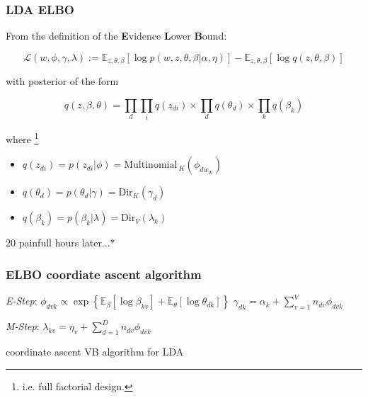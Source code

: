 \documentclass[10pt]{beamer}
\begin{document}
\begin{frame}
\frametitle{LDA ELBO}

From the definition of the \textbf{E}vidence \textbf{L}ower \textbf{B}ound:

$$ \mathcal{L}(w, \phi, \gamma, \lambda) := \mathbb{E}_{z, \theta, \beta}\left[\log p(w, z, \theta, \beta| \alpha, \eta) \right] - \mathbb{E}_{z, \theta, \beta}\left[\log q(z, \theta, \beta) \right]$$

with posterior of the form

$$q(z, \beta, \theta) = \prod_d \prod_i q(z_{di}) \times \prod_d q(\theta_d) \times \prod_k q(\beta_k)$$

where \footnote{i.e. full factorial design.}

\begin{itemize}
    \item $q(z_{di}) = p(z_{di}|\phi) = \mathrm{Multinomial}_{ \ K}(\phi_{dw_{di}}) $
    \item $q(\theta_d) = p(\theta_d|\gamma) = \mathrm{Dir}_{K}(\gamma_{d}) $
    \item $q(\beta_k) = p(\beta_k|\lambda) = \mathrm{Dir}_{V}(\lambda_{k}) $  
\end{itemize}

\end{frame}


\begin{frame}

\begin{center}
    20 painfull hours later...*
\end{center}



\end{frame}


\begin{frame}
\frametitle{ELBO coordiate ascent algorithm}

\begin{algorithm}[H]
\begin{algorithmic}[1]

        \STATE \emph{E-Step}:
            \STATE $\phi_{dvk} \propto \exp \left\{ \mathbb{E}_{\beta} \left[ \log \beta_{k v} \right] + \mathbb{E}_{\theta} \left[ \log \theta_{d k} \right] \right\}$
            \STATE $\gamma_{dk} = \alpha_k  + \sum_{v=1}^V n_{dv} \phi_{dvk}$
        \ENDFOR 
        
    \ENDWHILE
    \STATE \emph{M-Step}:
    \STATE $\lambda_{kv} = \eta_v + \sum_{d=1}^D n_{dv}\phi_{dvk}$
\ENDWHILE

\end{algorithmic}
\caption{coordinate ascent VB algorithm for LDA}
\label{alg:seq}
\end{algorithm}

\end{frame}
\end{document}
